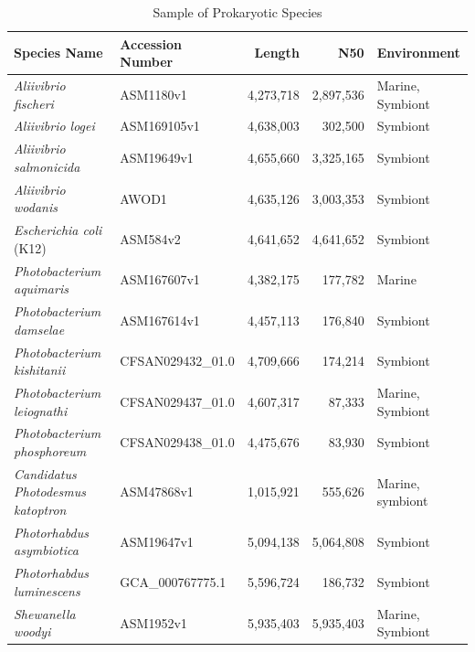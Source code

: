 \documentclass[fleqn,12pt]{wlscirep}
\begin{document}
\begin{table}[!ht]
\caption{Sample of Prokaryotic Species}
\begin{tabular}{llrrl}
Species Name                     & Accession Number  & Length & N50 & Environment        \\ \hline
\textit{Aliivibrio fischeri}              & ASM1180v1         & 4,273,718            & 2,897,536  & Marine, Symbiont \cite{21}   \\
\textit{Aliivibrio logei}                 & ASM169105v1       & 4,638,003            & 302,500    & Symbiont \cite{21}           \\
\textit{Aliivibrio salmonicida}           & ASM19649v1        & 4,655,660            & 3,325,165  & Symbiont \cite{22}           \\
\textit{Aliivibrio wodanis}               & AWOD1             & 4,635,126            & 3,003,353  & Symbiont \cite{4}            \\
\textit{Escherichia coli} (K12)           & ASM584v2          & 4,641,652            & 4,641,652  & Symbiont \cite{23}    \\
\textit{Photobacterium aquimaris}         & ASM167607v1       & 4,382,175            & 177,782    & Marine \cite{4}              \\
\textit{Photobacterium damselae}          & ASM167614v1       & 4,457,113            & 176,840    & Symbiont \cite{4}            \\
\textit{Photobacterium kishitanii}        & CFSAN029432\_01.0 & 4,709,666            & 174,214    & Symbiont \cite{21}           \\
\textit{Photobacterium leiognathi}        & CFSAN029437\_01.0 & 4,607,317            & 87,333     & Marine, Symbiont \cite{21}   \\
\textit{Photobacterium phosphoreum}       & CFSAN029438\_01.0 & 4,475,676            & 83,930     & Symbiont \cite{21}           \\
\textit{Candidatus Photodesmus katoptron} & ASM47868v1        & 1,015,921            & 555,626    & Marine, symbiont \cite{24}   \\
\textit{Photorhabdus asymbiotica}         & ASM19647v1        & 5,094,138            & 5,064,808  & Symbiont \cite{4}            \\
\textit{Photorhabdus luminescens}         & GCA\_000767775.1  & 5,596,724            & 186,732    & Symbiont \cite{4}            \\
\textit{Shewanella woodyi}                & ASM1952v1         & 5,935,403            & 5,935,403  & Marine, Symbiont \cite{4}    \\

\end{tabular}
\end{table}
\end{document}

